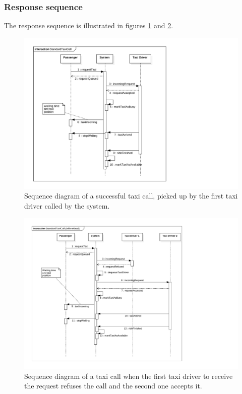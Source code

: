 \subsubsection{Response sequence}
The response sequence is illustrated in figures \ref{fig:sequence-taxicall} and \ref{fig:sequence-taxicall-refused}.
\begin{figure}
\includegraphics[width=\textwidth]{diagrams/sequence_taxicall.pdf}
\caption{Sequence diagram of a successful taxi call, picked up by the first taxi driver called by the system.}
\label{fig:sequence-taxicall}
\end{figure}

\begin{figure}
\includegraphics[width=\textwidth]{diagrams/sequence_taxicall_refused.pdf}
\caption{Sequence diagram of a taxi call when the first taxi driver to receive the request refuses the call and the second one accepts it.}
\label{fig:sequence-taxicall-refused}
\end{figure}

